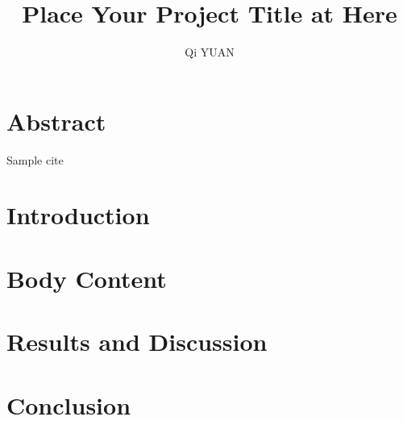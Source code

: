 \documentclass[12pt]{article}
\title{Place Your Project Title at Here}
\author{\textup{Qi YUAN}}
\begin{document}

\tableofcontents
\newpage

\section{Abstract}
Sample cite \autocite{farokhzad2009impact} %

\section{Introduction}

\section{Body Content}

\section{Results and Discussion}

\section{Conclusion}

\printbibliography %
\end{document}
